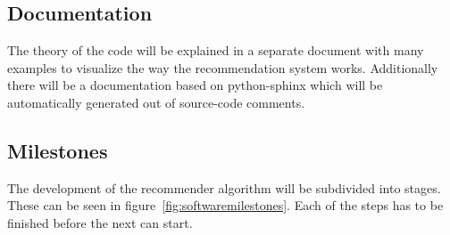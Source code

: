 \subsection{Documentation}
The theory of the code will be explained in a separate document with many examples to visualize the way the recommendation system works.
Additionally there will be a documentation based on python-sphinx which will be automatically generated out of source-code comments.


\subsection{Milestones}
The development of the recommender algorithm will be subdivided into stages.
These can be seen in figure~\ref{fig:softwaremilestones}.
Each of the steps has to be finished before the next can start.\\

